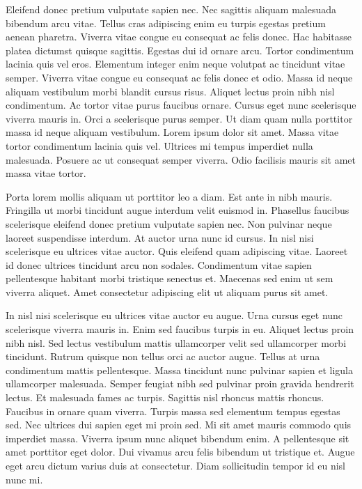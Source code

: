\documentclass[11pt,a4paper]{article}
\begin{document}
Eleifend donec pretium vulputate sapien nec. Nec sagittis aliquam malesuada bibendum arcu vitae. Tellus cras adipiscing enim eu turpis egestas pretium aenean pharetra. Viverra vitae congue eu consequat ac felis donec. Hac habitasse platea dictumst quisque sagittis. Egestas dui id ornare arcu. Tortor condimentum lacinia quis vel eros. Elementum integer enim neque volutpat ac tincidunt vitae semper. Viverra vitae congue eu consequat ac felis donec et odio. Massa id neque aliquam vestibulum morbi blandit cursus risus. Aliquet lectus proin nibh nisl condimentum. Ac tortor vitae purus faucibus ornare. Cursus eget nunc scelerisque viverra mauris in. Orci a scelerisque purus semper. Ut diam quam nulla porttitor massa id neque aliquam vestibulum. Lorem ipsum dolor sit amet. Massa vitae tortor condimentum lacinia quis vel. Ultrices mi tempus imperdiet nulla malesuada. Posuere ac ut consequat semper viverra. Odio facilisis mauris sit amet massa vitae tortor.

Porta lorem mollis aliquam ut porttitor leo a diam. Est ante in nibh mauris. Fringilla ut morbi tincidunt augue interdum velit euismod in. Phasellus faucibus scelerisque eleifend donec pretium vulputate sapien nec. Non pulvinar neque laoreet suspendisse interdum. At auctor urna nunc id cursus. In nisl nisi scelerisque eu ultrices vitae auctor. Quis eleifend quam adipiscing vitae. Laoreet id donec ultrices tincidunt arcu non sodales. Condimentum vitae sapien pellentesque habitant morbi tristique senectus et. Maecenas sed enim ut sem viverra aliquet. Amet consectetur adipiscing elit ut aliquam purus sit amet.

In nisl nisi scelerisque eu ultrices vitae auctor eu augue. Urna cursus eget nunc scelerisque viverra mauris in. Enim sed faucibus turpis in eu. Aliquet lectus proin nibh nisl. Sed lectus vestibulum mattis ullamcorper velit sed ullamcorper morbi tincidunt. Rutrum quisque non tellus orci ac auctor augue. Tellus at urna condimentum mattis pellentesque. Massa tincidunt nunc pulvinar sapien et ligula ullamcorper malesuada. Semper feugiat nibh sed pulvinar proin gravida hendrerit lectus. Et malesuada fames ac turpis. Sagittis nisl rhoncus mattis rhoncus. Faucibus in ornare quam viverra. Turpis massa sed elementum tempus egestas sed. Nec ultrices dui sapien eget mi proin sed. Mi sit amet mauris commodo quis imperdiet massa. Viverra ipsum nunc aliquet bibendum enim. A pellentesque sit amet porttitor eget dolor. Dui vivamus arcu felis bibendum ut tristique et. Augue eget arcu dictum varius duis at consectetur. Diam sollicitudin tempor id eu nisl nunc mi.
\end{document}
